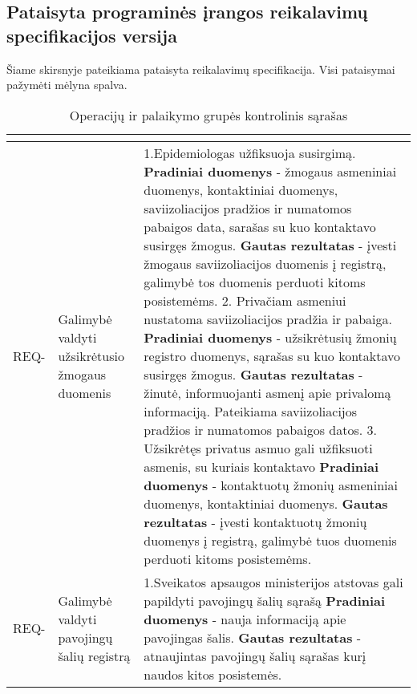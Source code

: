 \documentclass{VUMIFPSkursinis}
\newcounter{counter}
\newcommand{\reqCode}{%
	 \stepcounter{counter}%
	\color{blue} REQ-\thecounter}
\begin{document}
\subsection{Pataisyta programinės įrangos reikalavimų specifikacijos versija}

Šiame skirsnyje pateikiama pataisyta reikalavimų specifikacija. Visi pataisymai pažymėti mėlyna spalva.

\begin{center}
	\small
	\begin{longtable}{|C{2cm}|L{5cm}|L{8cm}|}
		\caption{Operacijų ir palaikymo grupės kontrolinis sąrašas}
		\label{table:EmployeeSalary}
		\\ \hline
		                   &
		             &
		\\ \hline
		\reqCode                                                          &
		Galimybė valdyti užsikrėtusio žmogaus duomenis                    &
		{\color{blue} 1.Epidemiologas užfiksuoja susirgimą.} \textbf{Pradiniai duomenys} - žmogaus asmeniniai duomenys, kontaktiniai duomenys, saviizoliacijos pradžios ir numatomos pabaigos data, sarašas su kuo kontaktavo susirgęs žmogus.
		\textbf{Gautas rezultatas} - įvesti žmogaus saviizoliacijos duomenis į registrą, galimybė tos duomenis perduoti kitoms posistemėms. {\color{blue} 2. Privačiam asmeniui nustatoma saviizoliacijos pradžia ir pabaiga. \textbf{Pradiniai duomenys} - užsikrėtusių žmonių registro duomenys, sąrašas su kuo kontaktavo susirgęs žmogus. \textbf{Gautas rezultatas} - žinutė, informuojanti asmenį apie privalomą informaciją. Pateikiama saviizoliacijos pradžios ir numatomos pabaigos datos. 3. Užsikrėtęs privatus asmuo gali užfiksuoti asmenis, su kuriais kontaktavo \textbf{Pradiniai duomenys} - kontaktuotų žmonių asmeniniai duomenys, kontaktiniai duomenys. \textbf{Gautas rezultatas} - įvesti kontaktuotų žmonių duomenys į registrą, galimybė tuos duomenis perduoti kitoms posistemėms.} \\ \hline
		\reqCode                                                          &
		Galimybė valdyti pavojingų šalių registrą                         &
		{\color{blue} 1.Sveikatos apsaugos ministerijos atstovas gali papildyti pavojingų šalių sąrašą }\textbf{Pradiniai duomenys} - nauja informaciją apie pavojingas šalis. \textbf{Gautas rezultatas} - atnaujintas pavojingų šalių sąrašas kurį naudos kitos posistemės.

\end{longtable}
\end{center}
\end{document}
